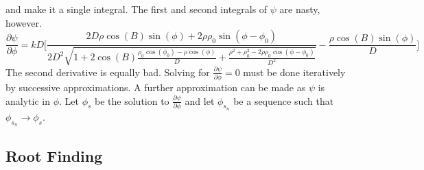 \documentclass[crop=false,class=book,oneside]{standalone}
\begin{document}
            and make it a single integral. The first and
            second integrals of $\psi$ are nasty, however.
            \begin{equation}
                \frac{\partial \psi}
                     {\partial \phi}
                =kD\Big[\frac{2D\rho\cos(B)\sin(\phi)+2\rho\rho_{0}
                \sin(\phi-\phi_{0})}{2D^2\sqrt{1+2\cos(B)
                \frac{\rho_{0}\cos(\phi_{0})-\rho\cos(\phi)}{D}+
                \frac{\rho^{2}+\rho_{0}^{2}-
                2\rho\rho_{0}\cos(\phi-\phi_{0})}{D^2}}}-
                \frac{\rho\cos(B)\sin(\phi)}{D}\Big]
            \end{equation}
            The second derivative is equally bad.
            Solving for $\frac{\partial\psi}{\partial\phi}=0$
            must be done iteratively by successive approximations.
            A further approximation can be made as $\psi$
            is analytic in $\phi$. Let $\phi_{s}$ be
            the solution to $\frac{\partial\psi}{\partial\phi}$
            and let $\phi_{s_{n}}$ be a sequence such that
            $\phi_{s_{n}}\rightarrow\phi_{s}$.
        \subsection{Root Finding}
\end{document}

